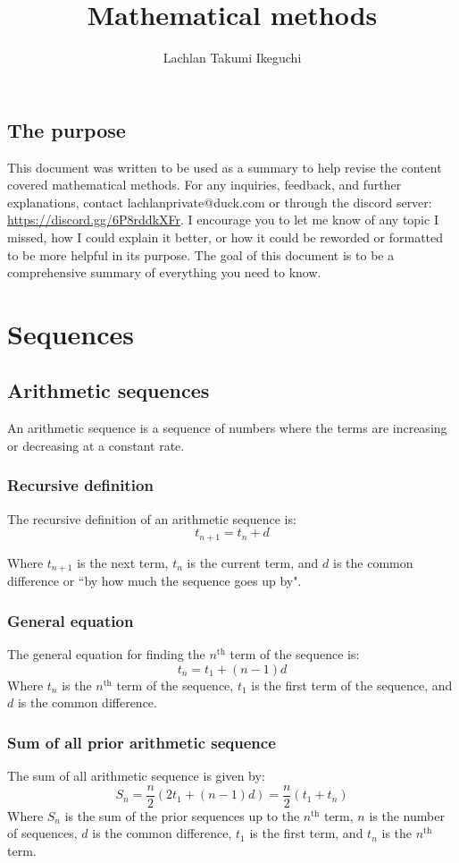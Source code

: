 \documentclass{book}
\title{Mathematical methods}
\author{Lachlan Takumi Ikeguchi}
\begin{document}
\maketitle
\tableofcontents

\section{The purpose}
This document was written to be used as a summary to help revise the content covered mathematical methods.  For any inquiries, feedback, and further explanations, contact lachlanprivate@duck.com or through the discord server: \url{https://discord.gg/6P8rddkXFr}. I encourage you to let me know of any topic I missed, how I could explain it better, or how it could be reworded or formatted to be more helpful in its purpose.  The goal of this document is to be a comprehensive summary of everything you need to know.



\chapter{Sequences}
\section{Arithmetic sequences}
An arithmetic sequence is a sequence of numbers where the terms are increasing or decreasing at a constant rate.

\subsection{Recursive definition}
The recursive definition of an arithmetic sequence is:
\[
	t_{n + 1} = t_n + d
\]

Where $t_{n + 1}$ is the next term, $t_n$ is the current term, and $d$ is the common difference or ``by how much the sequence goes up by".

\subsection{General equation}
The general equation for finding the $n^{\text{th}}$ term of the sequence is:
\[
	t_n = t_1 + (n - 1)d
\]
Where $t_n$ is the $n^{\text{th}}$ term of the sequence, $t_1$ is the first term of the sequence, and $d$ is the common difference.

\subsection{Sum of all prior arithmetic sequence}
The sum of all arithmetic sequence is given by:
\[
	S_n = \frac{n}{2}(2t_1 + (n - 1)d) = \frac{n}{2}(t_1 + t_n)
\]
Where $S_n$ is the sum of the prior sequences up to the $n^{\text{th}}$ term, $n$ is the number of sequences, $d$ is the common difference, $t_1$ is the first term, and $t_n$ is the $n^{\text{th}}$ term.
\end{document}
